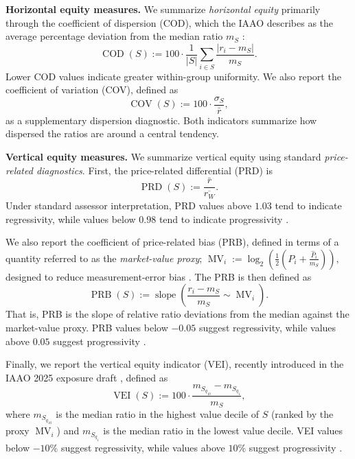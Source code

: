 \documentclass[12pt, draft]{article}
\theoremstyle{plain}
\theoremstyle{definition}
\newcommand{\1}{\mathbf{1}}
\begin{document}
\medskip
\noindent\textbf{Horizontal equity measures.}
We summarize \textit{horizontal equity} primarily through the coefficient of dispersion (COD), which the IAAO describes as the average percentage deviation from the median ratio $m_S$ \cite{IAAO2013Ratio,IAAO2025ExposureRatio}:
\begin{equation}
\label{eq:cod}
\operatorname{COD}(S)
:=
100\cdot\frac{1}{|S|}
\sum_{i\in S}\frac{|r_i-m_S|}{m_S}.
\end{equation}
Lower COD values indicate greater within-group uniformity. We also report the coefficient of variation (COV), defined as
\begin{equation}
\label{eq:cov_metric}
\operatorname{COV}(S)
:=
100\cdot\frac{\sigma_S}{\bar r},
\end{equation}
as a supplementary dispersion diagnostic. Both indicators summarize how dispersed the ratios are around a central tendency.

\medskip
\noindent\textbf{Vertical equity measures.}
We summarize vertical equity using standard \textit{price-related diagnostics}. First, the price-related differential (PRD) is
\begin{equation}
\label{eq:prd}
\operatorname{PRD}(S)
:=
\frac{\bar r}{\overline{r_W}}.
\end{equation}
Under standard assessor interpretation, PRD values above $1.03$ tend to indicate regressivity, while values below $0.98$ tend to indicate progressivity \cite{IAAO2013Ratio,IAAO2025ExposureRatio}.

We also report the coefficient of price-related bias (PRB), defined in terms of a quantity referred to as the \textit{market-value proxy}; \cite{IAAO2025ExposureRatio}
$
\operatorname{MV}_i
:=
\log_2\!\left(\frac{1}{2}\left(P_i+\frac{\widehat P_i}{m_S}\right)\right),
$
designed to reduce measurement-error bias \cite{IAAO2025ExposureRatio}. The PRB is then defined as
\begin{equation}
\label{eq:prb}
\operatorname{PRB}(S)
:=
\operatorname{slope}\!\left(\frac{r_i-m_S}{m_S}\sim \operatorname{MV}_i\right).
\end{equation}
That is, PRB is the slope of relative ratio deviations from the median against the market-value proxy. PRB values below $-0.05$ suggest regressivity, while values above $0.05$ suggest progressivity \cite{IAAO2013Ratio,IAAO2025ExposureRatio}.

Finally, we report the vertical equity indicator (VEI), recently introduced in the IAAO 2025 exposure draft \cite{IAAO2025ExposureRatio}, defined as
\begin{equation}
\label{eq:vei}
\operatorname{VEI}(S)
:=
100\cdot\frac{m_{S_{q_{10}}}-m_{S_{q_1}}}{m_S},
\end{equation}
where $m_{S_{q_{10}}}$ is the median ratio in the highest value decile of $S$ (ranked by the proxy $\operatorname{MV}_i$) and $m_{S_{q_1}}$ is the median ratio in the lowest value decile. VEI values below $-10\%$ suggest regressivity, while values above $10\%$ suggest progressivity \cite{IAAO2025ExposureRatio}.
\end{document}
